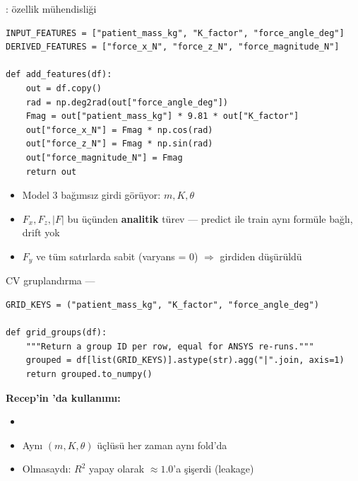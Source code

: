 \begin{frame}[fragile]{: özellik mühendisliği}
\begin{lstlisting}
INPUT_FEATURES = ["patient_mass_kg", "K_factor", "force_angle_deg"]
DERIVED_FEATURES = ["force_x_N", "force_z_N", "force_magnitude_N"]

def add_features(df):
    out = df.copy()
    rad = np.deg2rad(out["force_angle_deg"])
    Fmag = out["patient_mass_kg"] * 9.81 * out["K_factor"]
    out["force_x_N"] = Fmag * np.cos(rad)
    out["force_z_N"] = Fmag * np.sin(rad)
    out["force_magnitude_N"] = Fmag
    return out
\end{lstlisting}

  \vspace{0.2cm}
  \begin{itemize}\small
    \item Model 3 bağımsız girdi görüyor: \(m, K, \theta\)
    \item \(F_x, F_z, |F|\) bu üçünden \textbf{analitik} türev --- predict ile
          train aynı formüle bağlı, drift yok
    \item \(F_y\) ve  tüm satırlarda sabit
          (varyans = 0) \(\Rightarrow\) girdiden düşürüldü
  \end{itemize}
\end{frame}

\begin{frame}[fragile]{CV gruplandırma --- }
\begin{lstlisting}
GRID_KEYS = ("patient_mass_kg", "K_factor", "force_angle_deg")

def grid_groups(df):
    """Return a group ID per row, equal for ANSYS re-runs."""
    grouped = df[list(GRID_KEYS)].astype(str).agg("|".join, axis=1)
    return grouped.to_numpy()
\end{lstlisting}

  \vspace{0.4cm}
  \textbf{Recep'in 'da kullanımı:}
  \begin{itemize}\small
    \item {}
    \item Aynı \((m, K, \theta)\) üçlüsü her zaman aynı fold'da
    \item Olmasaydı: \(R^2\) yapay olarak \(\approx 1.0\)'a şişerdi (leakage)
  \end{itemize}
\end{frame}

